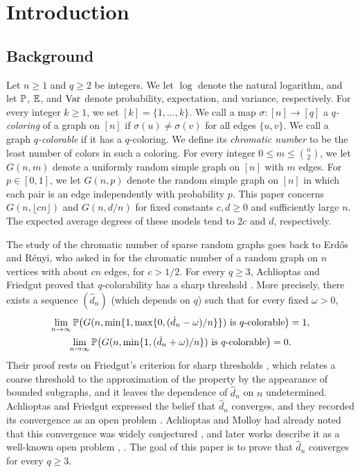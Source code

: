 \chapter{Introduction}\label{sec:intro}

\section{Background}\label{sec:intro-background}

Let $n \ge 1$ and $q \ge 2$ be integers. We let $\log$ denote the natural logarithm, and let $\mathbb P$, $\mathbb E$, and $\operatorname{Var}$ denote probability, expectation, and variance, respectively. For every integer $k \ge 1$, we set $[k] = \{1, \dots, k\}$. We call a map $\sigma\colon[n] \to [q]$ a \emph{$q$-coloring} of a graph on $[n]$ if $\sigma(u) \ne \sigma(v)$ for all edges $\{u, v\}$. We call a graph \emph{$q$-colorable} if it has a $q$-coloring. We define its \emph{chromatic number} to be the least number of colors in such a coloring. For every integer $0 \le m \le \binom n2$, we let $G(n, m)$ denote a uniformly random simple graph on $[n]$ with $m$ edges. For $p \in [0, 1]$, we let $G(n, p)$ denote the random simple graph on $[n]$ in which each pair is an edge independently with probability $p$. This paper concerns $G(n, \lfloor cn\rfloor)$ and $G(n, d/n)$ for fixed constants $c, d \ge 0$ and sufficiently large $n$. The expected average degrees of these models tend to $2c$ and $d$, respectively.

The study of the chromatic number of sparse random graphs goes back to Erdős and Rényi, who asked in \cite[Section~10, p.~59]{erdos1960evolution} for the chromatic number of a random graph on $n$ vertices with about $cn$ edges, for $c > 1/2$. For every $q \ge 3$, Achlioptas and Friedgut proved that $q$-colorability has a sharp threshold \cite[Theorem~1.1]{achlioptas1999sharp}. More precisely, there exists a sequence $(\hat d_n)$ (which depends on $q$) such that for every fixed $\omega > 0$,
\begin{equation}\label{eq:intro-af}
\begin{gathered}
\lim_{n \to \infty} \mathbb P\bigl(G(n, \min\{1, \max\{0, (\hat d_n - \omega)/n\}\}) \text{ is $q$-colorable}\bigr) = 1, \\
\lim_{n \to \infty} \mathbb P\bigl(G(n, \min\{1, (\hat d_n + \omega)/n\}) \text{ is $q$-colorable}\bigr) = 0.
\end{gathered}
\end{equation}
Their proof rests on Friedgut's criterion for sharp thresholds \cite{friedgut1999sharp}, which relates a coarse threshold to the approximation of the property by the appearance of bounded subgraphs, and it leaves the dependence of $\hat d_n$ on $n$ undetermined. Achlioptas and Friedgut expressed the belief that $\hat d_n$ converges, and they recorded its convergence as an open problem \cite[Remark~1.2]{achlioptas1999sharp}. Achlioptas and Molloy had already noted that this convergence was widely conjectured \cite[p.~204]{achlioptas1997analysis}, and later works describe it as a well-known open problem \cite[Section~1.1]{cojaoghlan2016chromatica}, \cite[Section~1]{bapst2016condensation}. The goal of this paper is to prove that $\hat d_n$ converges for every $q \ge 3$.

